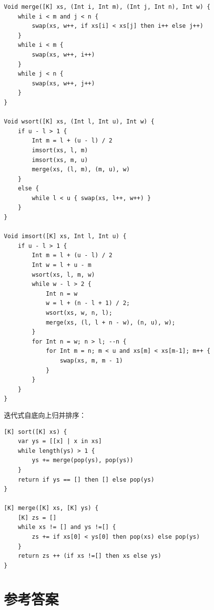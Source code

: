 \documentclass[b5paper]{ctexart}
\begin{document}
\begin{lstlisting}[language = Bourbaki]
Void merge([K] xs, (Int i, Int m), (Int j, Int n), Int w) {
    while i < m and j < n {
        swap(xs, w++, if xs[i] < xs[j] then i++ else j++)
    }
    while i < m {
        swap(xs, w++, i++)
    }
    while j < n {
        swap(xs, w++, j++)
    }
}

Void wsort([K] xs, (Int l, Int u), Int w) {
    if u - l > 1 {
        Int m = l + (u - l) / 2
        imsort(xs, l, m)
        imsort(xs, m, u)
        merge(xs, (l, m), (m, u), w)
    }
    else {
        while l < u { swap(xs, l++, w++) }
    }
}

Void imsort([K] xs, Int l, Int u) {
    if u - l > 1 {
        Int m = l + (u - l) / 2
        Int w = l + u - m
        wsort(xs, l, m, w)
        while w - l > 2 {
            Int n = w
            w = l + (n - l + 1) / 2;
            wsort(xs, w, n, l);
            merge(xs, (l, l + n - w), (n, u), w);
        }
        for Int n = w; n > l; --n {
            for Int m = n; m < u and xs[m] < xs[m-1]; m++ {
                swap(xs, m, m - 1)
            }
        }
    }
}
\end{lstlisting}

迭代式自底向上归并排序：

\begin{lstlisting}[language = Bourbaki]
[K] sort([K] xs) {
    var ys = [[x] | x in xs]
    while length(ys) > 1 {
        ys += merge(pop(ys), pop(ys))
    }
    return if ys == [] then [] else pop(ys)
}

[K] merge([K] xs, [K] ys) {
    [K] zs = []
    while xs != [] and ys !=[] {
        zs += if xs[0] < ys[0] then pop(xs) else pop(ys)
    }
    return zs ++ (if xs !=[] then xs else ys)
}
\end{lstlisting}

\ifx\wholebook\relax\else
\section{参考答案}
\shipoutAnswer
\end{document}
